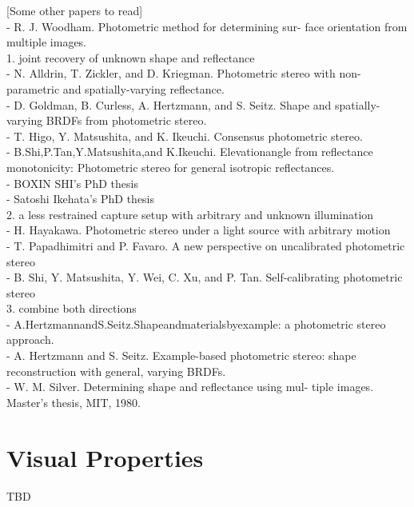 [Some other papers to read] \\
- R. J. Woodham. Photometric method for determining sur-
face orientation from multiple images.\\
1. joint recovery of unknown shape and reflectance\\
- N. Alldrin, T. Zickler, and D. Kriegman. Photometric stereo with non-parametric and spatially-varying reflectance.\\
- D. Goldman, B. Curless, A. Hertzmann, and S. Seitz. Shape and spatially-varying BRDFs from photometric stereo.\\
- T. Higo, Y. Matsushita, and K. Ikeuchi. Consensus photometric stereo.\\
- B.Shi,P.Tan,Y.Matsushita,and K.Ikeuchi. Elevationangle from reflectance monotonicity: Photometric stereo for general isotropic reflectances.\\
- BOXIN SHI's PhD thesis\\
- Satoshi Ikehata's PhD thesis\\
2. a less restrained capture setup with arbitrary and unknown illumination\\
- H. Hayakawa. Photometric stereo under a light source with arbitrary motion\\
- T. Papadhimitri and P. Favaro. A new perspective on uncalibrated photometric stereo\\
- B. Shi, Y. Matsushita, Y. Wei, C. Xu, and P. Tan. Self-calibrating photometric stereo\\
3. combine both directions\\
- A.HertzmannandS.Seitz.Shapeandmaterialsbyexample: a photometric stereo approach.\\
- A. Hertzmann and S. Seitz. Example-based photometric stereo: shape reconstruction with general, varying BRDFs.\\
- W. M. Silver. Determining shape and reflectance using mul- tiple images. Master’s thesis, MIT, 1980.\\




\section{Visual Properties}
\label{sec:VisProp}

TBD





\endinput
